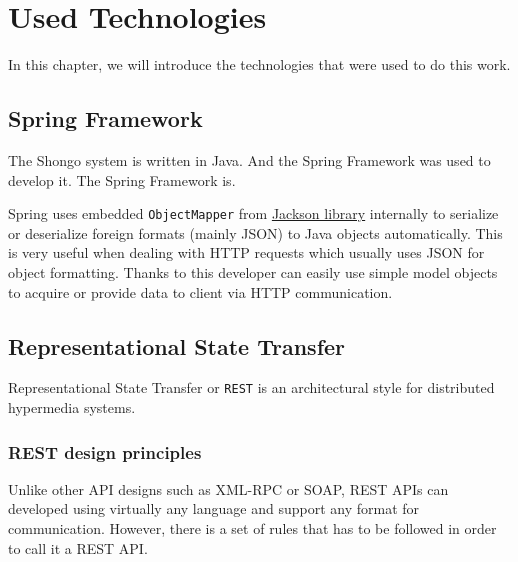 \chapter{Used Technologies}
In this chapter, we will introduce the technologies that were used to do this work.

\section{Spring Framework} \label{sec:spring}
The Shongo system is written in Java. And the Spring Framework was used to develop it. \cite{spring}
The Spring Framework is. \cite{walls2022spring}

Spring uses embedded \texttt{ObjectMapper} from \hyperref[sec:jackson]{Jackson library} internally to serialize or deserialize foreign formats (mainly JSON) to Java objects automatically. This is very useful when dealing with HTTP requests which usually uses JSON for object formatting. Thanks to this developer can easily use simple model objects to acquire or provide data to client via HTTP communication.


\section{Representational State Transfer} \label{rest}
Representational State Transfer or \texttt{REST} is an architectural style for distributed hypermedia systems. \cite{fielding2000rest}
\subsection{REST design principles}
Unlike other API designs such as XML-RPC or SOAP, REST APIs can developed using virtually any language and support any format for communication. However, there is a set of rules that has to be followed in order to call it a REST API.

